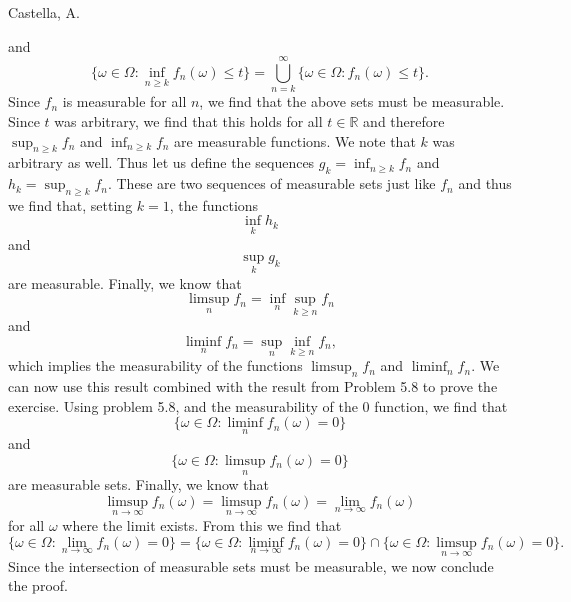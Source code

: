 \begin{solution}[5.7]{Castella, A.}
\begin{itemize}
$$        $$
        and
        $$
            \{\omega \in \Omega : \inf_{n \geq k}f_n(\omega) \leq t\} = \bigcup_{n=k}^\infty \{\omega \in \Omega : f_n(\omega) \leq t\}.
        $$
        Since $f_n$ is measurable for all $n$, we find that the above sets must be measurable. Since $t$ was arbitrary, we find that this holds for all $t \in \mathbb{R}$ and therefore $\sup_{n \geq k}f_n$ and $\inf_{n \geq k}f_n$ are measurable functions. We note that $k$ was arbitrary as well. Thus let us define the sequences $g_k = \inf_{n \geq k}f_n$ and $h_k = \sup_{n \geq k}f_n$. These are two sequences of measurable sets just like $f_n$ and thus we find that, setting $k = 1$, the functions
        $$
            \inf_kh_k
        $$
        and
        $$
            \sup_kg_k
        $$
        are measurable. Finally, we know that
        $$
            \limsup_nf_n = \inf_n\sup_{k\geq n}f_n
        $$
        and
        $$
            \liminf_nf_n = \sup_n\inf_{k \geq n}f_n,
        $$
        which implies the measurability of the functions $\limsup_nf_n$ and $\liminf_nf_n$. We can now use this result combined with the result from Problem 5.8 to prove the exercise. Using problem 5.8, and the measurability of the 0 function, we find that
        $$
            \{\omega \in \Omega : \liminf_nf_n(\omega) = 0\}
        $$
        and
        $$
            \{\omega \in \Omega : \limsup_nf_n(\omega) = 0\}
        $$
        are measurable sets. Finally, we know that
        $$
            \limsup_{n\rightarrow\infty}f_n(\omega) = \limsup_{n\rightarrow\infty}f_n(\omega) = \lim_{n\rightarrow\infty}f_n(\omega)
        $$
        for all $\omega$ where the limit exists. From this we find that
        $$
            \{\omega \in \Omega : \lim_{n\rightarrow\infty}f_n(\omega) = 0\} = \{\omega \in \Omega : \liminf_{n\rightarrow\infty}f_n(\omega) = 0\}\cap\{\omega \in \Omega : \limsup_{n\rightarrow\infty}f_n(\omega) = 0\}.
        $$
        Since the intersection of measurable sets must be measurable, we now conclude the proof.
    \end{itemize}
\end{solution}

